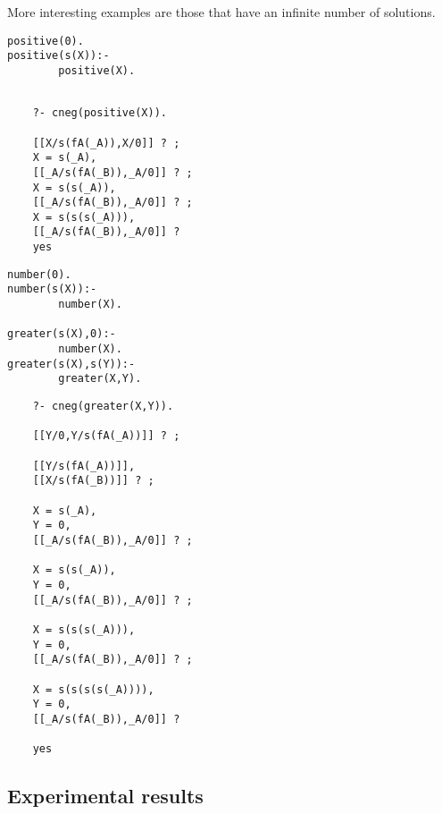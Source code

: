 \documentclass{llncs}
\begin{document}
More interesting examples are those that have an infinite number of
solutions.

\begin{minipage}{2in}
\begin{verbatim}
positive(0). 
positive(s(X)):-
        positive(X).  
\end{verbatim}
\end{minipage}
\begin{minipage}{2in}
\begin{verbatim} 

    ?- cneg(positive(X)).

    [[X/s(fA(_A)),X/0]] ? ;
    X = s(_A),
    [[_A/s(fA(_B)),_A/0]] ? ;
    X = s(s(_A)),
    [[_A/s(fA(_B)),_A/0]] ? ;
    X = s(s(s(_A))),
    [[_A/s(fA(_B)),_A/0]] ? 
    yes
\end{verbatim} 
\end{minipage}

\begin{minipage}{2in}
\begin{verbatim}
number(0).
number(s(X)):-
        number(X).

greater(s(X),0):-
        number(X).
greater(s(X),s(Y)):-
        greater(X,Y).
\end{verbatim}
\end{minipage}
\begin{minipage}{2in}
\begin{verbatim} 
    ?- cneg(greater(X,Y)).

    [[Y/0,Y/s(fA(_A))]] ? ;

    [[Y/s(fA(_A))]],
    [[X/s(fA(_B))]] ? ;

    X = s(_A),
    Y = 0,
    [[_A/s(fA(_B)),_A/0]] ? ;

    X = s(s(_A)),
    Y = 0,
    [[_A/s(fA(_B)),_A/0]] ? ;

    X = s(s(s(_A))),
    Y = 0,
    [[_A/s(fA(_B)),_A/0]] ? ;

    X = s(s(s(s(_A)))),
    Y = 0,
    [[_A/s(fA(_B)),_A/0]] ? 

    yes
\end{verbatim} 
\end{minipage}



\subsection{Experimental results}
\label{results}
\end{document}
